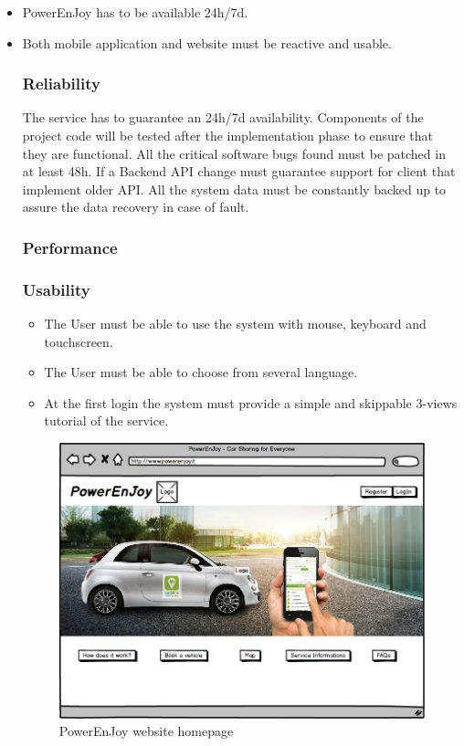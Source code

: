 \begin{itemize}
	\item PowerEnJoy has to be available 24h/7d.
	\item Both mobile application and website must be reactive and usable.
	
\subsubsection{Reliability}%

The service has to guarantee an 24h/7d availability. Components of the project code will be tested after the implementation phase to ensure that they are functional. 
All the critical software bugs found must be patched in at least 48h.
If a Backend API change must guarantee support for client that implement older API.
All the system data must be constantly backed up to assure the data recovery in case of fault.


\subsubsection{Performance}

\subsubsection{Usability}
\begin{itemize}
	\item The User must be able to use the system with mouse, keyboard and touchscreen.
	\item The User must be able to choose from several language.
	\item At the first login the system must provide a simple and skippable 3-views tutorial of the service.
\end{itemize}

\begin{figure}[h]
	\centering
\includegraphics[scale=0.4]{img/webhome}
	\caption{PowerEnJoy website homepage}
\end{figure}
\FloatBarrier


\end{itemize}
